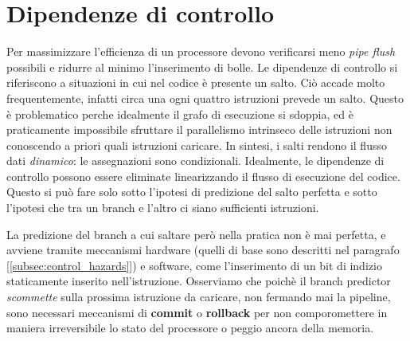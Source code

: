 \section{Dipendenze di controllo}
Per massimizzare l'efficienza di un processore devono verificarsi meno \textit{pipe flush} possibili e ridurre al minimo l'inserimento di bolle. Le dipendenze di controllo si riferiscono a situazioni in cui nel codice è presente un salto. Ciò accade molto frequentemente, infatti circa una ogni quattro istruzioni prevede un salto. Questo è problematico perche idealmente il grafo di esecuzione si sdoppia, ed è praticamente impossibile sfruttare il parallelismo intrinseco delle istruzioni non conoscendo a priori quali istruzioni caricare. In sintesi, i salti rendono il flusso dati \textit{dinamico}: le assegnazioni sono condizionali. Idealmente, le dipendenze di controllo possono essere eliminate linearizzando il flusso di esecuzione del codice. Questo si può fare solo sotto l'ipotesi di predizione del salto perfetta e sotto l'ipotesi che tra un branch e l'altro ci siano sufficienti istruzioni. 

\begin{figure}[ht]
    \centering
    \setlength{\fboxrule}{0.5pt} %
    \setlength{\fboxsep}{0pt}    %
\end{figure}


\noindent La predizione del branch a cui saltare però nella pratica non è mai perfetta, e avviene tramite meccanismi hardware (quelli di base sono descritti nel paragrafo [\ref{subsec:control_hazards}]) e software, come l'inserimento di un bit di indizio staticamente inserito nell'istruzione. Osserviamo che poichè il branch predictor \textit{scommette} sulla prossima istruzione da caricare, non fermando mai la pipeline, sono necessari meccanismi di \textbf{commit} o \textbf{rollback} per non comporomettere in maniera irreversibile lo stato del processore o peggio ancora della memoria. 


